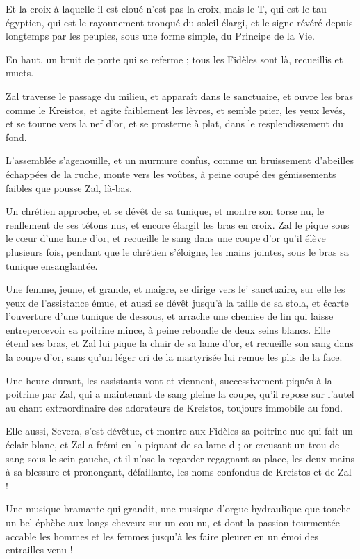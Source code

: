 \documentclass[a4paper, 11pt, oneside, polutonikogreek, french]{article}
\begin{document}
Et la croix à laquelle il est cloué n'est pas la croix, mais le T, qui est le tau égyptien, qui est le rayonnement tronqué du soleil élargi, et le signe révéré depuis longtemps par les peuples, sous une forme simple, du Principe de la Vie.

En haut, un bruit de porte qui se referme ; tous les Fidèles sont là, recueillis et muets.

Zal traverse le passage du milieu, et apparaît dans le sanctuaire, et ouvre les bras comme le Kreistos, et agite faiblement les lèvres, et semble prier, les yeux levés, et se tourne vers la nef d'or, et se prosterne à plat, dans le resplendissement du fond.

L'assemblée s'agenouille, et un murmure confus, comme un bruissement d'abeilles échappées de la ruche, monte vers les voûtes, à peine coupé des gémissements faibles que pousse Zal, là-bas.

Un chrétien approche, et se dévêt de sa tunique, et montre son torse nu, le renflement de ses tétons nus, et encore élargit les bras en croix. Zal le pique sous le cœur d'une lame d'or, et recueille le sang dans une coupe d'or qu'il élève plusieurs fois, pendant que le chrétien s'éloigne, les mains jointes, sous le bras sa tunique ensanglantée.

Une femme, jeune, et grande, et maigre, se dirige vers le' sanctuaire, sur elle les yeux de l'assistance émue, et aussi se dévêt jusqu'à la taille de sa stola, et écarte l'ouverture d'une tunique de dessous, et arrache une chemise de lin qui laisse entrepercevoir sa poitrine mince, à peine rebondie de deux seins blancs. Elle étend ses bras, et Zal lui pique la chair de sa lame d'or, et recueille son sang dans la coupe d'or, sans qu'un léger cri de la martyrisée lui remue les plis de la face.

Une heure durant, les assistants vont et viennent, successivement piqués à la poitrine par Zal, qui a maintenant de sang pleine la coupe, qu'il repose sur l'autel au chant extraordinaire des adorateurs de Kreistos, toujours immobile au fond.

Elle aussi, Severa, s'est dévêtue, et montre aux Fidèles sa poitrine nue qui fait un éclair blanc, et Zal a frémi en la piquant de sa lame d ; or creusant un trou de sang sous le sein gauche, et il n'ose la regarder regagnant sa place, les deux mains à sa blessure et prononçant, défaillante, les noms confondus de Kreistos et de Zal !

Une musique bramante qui grandit, une musique d’orgue hydraulique que touche un bel éphèbe aux longs cheveux sur un cou nu, et dont la passion tourmentée accable les hommes et les femmes jusqu'à les faire pleurer en un émoi des entrailles venu !
\end{document}
